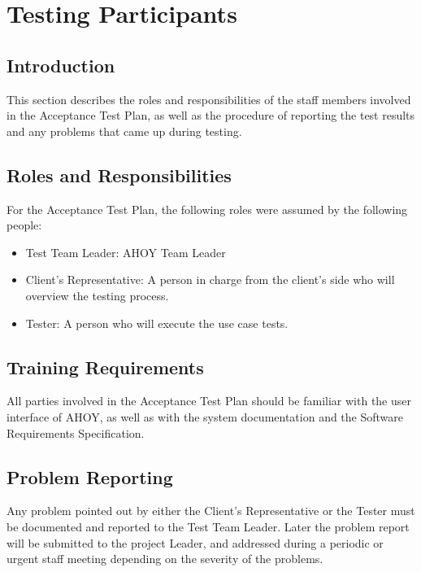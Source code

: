 \documentclass[titlepage]{article}
\begin{document}
\section{Testing Participants%
    \label{participiants}%
}


\subsection{Introduction}
    This section describes the roles and responsibilities of the staff members involved in the Acceptance Test Plan, as well as the procedure of reporting the test results and any problems that came up during testing.


\subsection{Roles and Responsibilities}
    For the Acceptance Test Plan, the following roles were assumed by the following people:
    \begin{itemize}
        \item Test Team Leader: AHOY Team Leader
        \item Client's Representative: A person in charge from the client's side who will overview the testing process.
        \item Tester: A person who will execute the use case tests.
    \end{itemize}


\subsection{Training Requirements}
    All parties involved in the Acceptance Test Plan should be familiar with the user interface of AHOY, as well as with the system documentation and the Software Requirements Specification.


\subsection{Problem Reporting}
    Any problem pointed out by either the Client's Representative or the Tester must be documented and reported to the Test Team Leader. Later the problem report will be submitted to the project Leader, and addressed during a periodic or urgent staff meeting depending on the severity of the problems.
\end{document}
